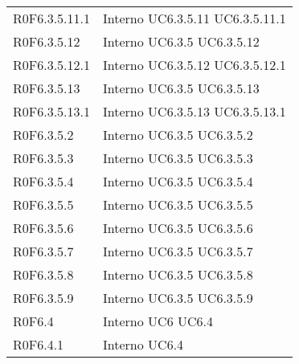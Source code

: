 \begin{longtable}{p{2.5cm}!{\VRule[1pt]}p{2.5cm}}
R0F6.3.5.11.1 & Interno \newline UC6.3.5.11
 \newline UC6.3.5.11.1
 \\
R0F6.3.5.12 & Interno \newline UC6.3.5
 \newline UC6.3.5.12
 \\
R0F6.3.5.12.1 & Interno \newline UC6.3.5.12
 \newline UC6.3.5.12.1
 \\
R0F6.3.5.13 & Interno \newline UC6.3.5
 \newline UC6.3.5.13
 \\
R0F6.3.5.13.1 & Interno \newline UC6.3.5.13
 \newline UC6.3.5.13.1
 \\
R0F6.3.5.2 & Interno \newline UC6.3.5
 \newline UC6.3.5.2
 \\
R0F6.3.5.3 & Interno \newline UC6.3.5
 \newline UC6.3.5.3
 \\
R0F6.3.5.4 & Interno \newline UC6.3.5
 \newline UC6.3.5.4
 \\
R0F6.3.5.5 & Interno \newline UC6.3.5
 \newline UC6.3.5.5
 \\
R0F6.3.5.6 & Interno \newline UC6.3.5
 \newline UC6.3.5.6
 \\
R0F6.3.5.7 & Interno \newline UC6.3.5
 \newline UC6.3.5.7
 \\
R0F6.3.5.8 & Interno \newline UC6.3.5
 \newline UC6.3.5.8
 \\
R0F6.3.5.9 & Interno \newline UC6.3.5
 \newline UC6.3.5.9
 \\
R0F6.4 & Interno \newline UC6
 \newline UC6.4
 \\
R0F6.4.1 & Interno \newline UC6.4

\end{longtable}
